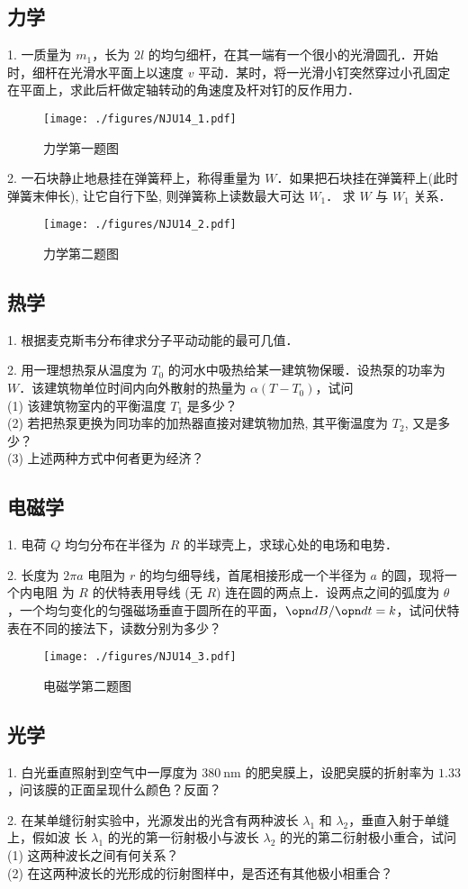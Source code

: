 \subsection{力学}
1. 一质量为 $m_{1}$，长为 $2l$ 的均匀细杆，在其一端有一个很小的光滑圆孔．开始时，细杆在光滑水平面上以速度 $v$ 平动．某时，将一光滑小钉突然穿过小孔固定在平面上，求此后杆做定轴转动的角速度及杆对钉的反作用力．
\begin{figure}[ht]
\centering
\texttt{[image: ./figures/NJU14\_1.pdf]}
\caption{力学第一题图} \label{NJU14_fig1}
\end{figure}
2. 一石块静止地悬挂在弹簧秤上，称得重量为 $W$．如果把石块挂在弹簧秤上(此时弹簧末伸长), 让它自行下坠, 则弹簧称上读数最大可达 $W_{1}$． 求 $W$ 与 $W_{1}$ 关系．
\begin{figure}[ht]
\centering
\texttt{[image: ./figures/NJU14\_2.pdf]}
\caption{力学第二题图} \label{NJU14_fig2}
\end{figure}
\subsection{热学}
1. 根据麦克斯韦分布律求分子平动动能的最可几值．

2. 用一理想热泵从温度为 $T_{0}$ 的河水中吸热给某一建筑物保暖．设热泵的功率为 $W$．该建筑物单位时间内向外散射的热量为 $\alpha\left(T-T_{0}\right)$，试问\\
(1) 该建筑物室内的平衡温度 $T_{1}$ 是多少？\\
(2) 若把热泵更换为同功率的加热器直接对建筑物加热, 其平衡温度为 $T_{2}$, 又是多少？\\
(3) 上述两种方式中何者更为经济？\\
\subsection{电磁学}
1. 电荷 $Q$ 均匀分布在半径为 $R$ 的半球壳上，求球心处的电场和电势．

2. 长度为 $2 \pi a$ 电阻为 $r$ 的均匀细导线，首尾相接形成一个半径为 $a$ 的圆，现将一个内电阻 为 $R$ 的伏特表用导线 (无 $R$) 连在圆的两点上．设两点之间的弧度为 $\theta$，一个均匀变化的匀强磁场垂直于圆所在的平面，$\opn dB/\opn dt =k$，试问伏特表在不同的接法下，读数分别为多少？
\begin{figure}[ht]
\centering
\texttt{[image: ./figures/NJU14\_3.pdf]}
\caption{电磁学第二题图} \label{NJU14_fig3}
\end{figure}
\subsection{光学}
1. 白光垂直照射到空气中一厚度为 $380 \mathrm{~nm}$ 的肥㚖膜上，设肥㚖膜的折射率为 $1.33$，问该膜的正面呈现什么颜色？反面？

2. 在某单缝衍射实验中，光源发出的光含有两种波长 $\lambda_{1}$ 和 $\lambda_{2}$，垂直入射于单缝上，假如波 长 $\lambda_{1}$ 的光的第一衍射极小与波长 $\lambda_{2}$ 的光的第二衍射极小重合，试问\\
(1) 这两种波长之间有何关系？\\
(2) 在这两种波长的光形成的衍射图样中，是否还有其他极小相重合？
